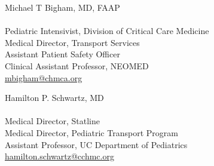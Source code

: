 \documentclass[twoside]{article}\usepackage[]{graphicx}\usepackage[]{color}
\begin{document}
\begin{multicols}{2}

  Michael T Bigham, MD, FAAP\\
  \\
  Pediatric Intensivist, Division of Critical Care Medicine\\
  Medical Director, Transport Services\\
  Assistant Patient Safety Officer\\
  Clinical Assistant Professor, NEOMED\\
  \url{mbigham@chmca.org}


Hamilton P. Schwartz, MD\\
\\
Medical Director, Statline\\
Medical Director, Pediatric Transport Program\\
Assistant Professor, UC Department of Pediatrics\\
\url{hamilton.schwartz@cchmc.org}\\

\end{multicols}

\newpage
\end{document}
